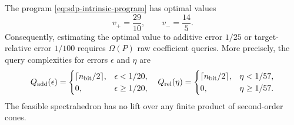 \begin{theorem}
\label{thm:sdp-intrinsic}
The program \eqref{eq:sdp-intrinsic-program} has optimal values
\begin{equation}
 v_+=\frac{29}{10},\qquad v_-=\frac{14}{5}.                 \label{eq:sdp-intrinsic-values}
\end{equation}
Consequently, estimating the optimal value to additive error $1/25$ or
target-relative error $1/100$ requires $\Omega(P)$ raw coefficient queries.
More precisely, the query complexities for errors $\epsilon$ and $\eta$ are
\begin{equation}
 Q_{\rm add}(\epsilon)=
 \begin{cases}\lceil n_{\rm bit}/2\rceil,&\epsilon<1/20,\\0,&\epsilon\geq1/20,
 \end{cases}
 \quad
 Q_{\rm rel}(\eta)=
 \begin{cases}\lceil n_{\rm bit}/2\rceil,&\eta<1/57,\\0,&\eta\geq1/57.
 \end{cases}                                                \label{eq:sdp-value-regimes}
\end{equation}
The feasible spectrahedron has no lift over any finite product of
second-order cones.
\end{theorem}

